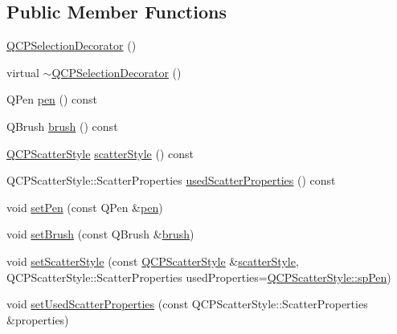 \subsection*{Public Member Functions}
\begin{DoxyCompactItemize}
\item 
\mbox{\hyperlink{class_q_c_p_selection_decorator_aa145480d9a062cd176fe30900bb7bca8}{Q\+C\+P\+Selection\+Decorator}} ()
\item 
virtual \mbox{\hyperlink{class_q_c_p_selection_decorator_ab211eb11379854dcbe23b1642be0d19e}{$\sim$\+Q\+C\+P\+Selection\+Decorator}} ()
\item 
Q\+Pen \mbox{\hyperlink{class_q_c_p_selection_decorator_a9307a60c9759223367909aed2d05ad91}{pen}} () const
\item 
Q\+Brush \mbox{\hyperlink{class_q_c_p_selection_decorator_a783b643aa52120a25308fc501b9998b1}{brush}} () const
\item 
\mbox{\hyperlink{class_q_c_p_scatter_style}{Q\+C\+P\+Scatter\+Style}} \mbox{\hyperlink{class_q_c_p_selection_decorator_aa6558f6f270a188bb633386aba0d1ae4}{scatter\+Style}} () const
\item 
Q\+C\+P\+Scatter\+Style\+::\+Scatter\+Properties \mbox{\hyperlink{class_q_c_p_selection_decorator_ab2019bf31dde39f1ec028e3810dfc08b}{used\+Scatter\+Properties}} () const
\item 
void \mbox{\hyperlink{class_q_c_p_selection_decorator_ac2c8192e1e294aa3a4a7f32a859e3d76}{set\+Pen}} (const Q\+Pen \&\mbox{\hyperlink{class_q_c_p_selection_decorator_a9307a60c9759223367909aed2d05ad91}{pen}})
\item 
void \mbox{\hyperlink{class_q_c_p_selection_decorator_aa74b626be518ea17055f918d423c8c2d}{set\+Brush}} (const Q\+Brush \&\mbox{\hyperlink{class_q_c_p_selection_decorator_a783b643aa52120a25308fc501b9998b1}{brush}})
\item 
void \mbox{\hyperlink{class_q_c_p_selection_decorator_ab403a613289714ff4fd4a0c0371ab116}{set\+Scatter\+Style}} (const \mbox{\hyperlink{class_q_c_p_scatter_style}{Q\+C\+P\+Scatter\+Style}} \&\mbox{\hyperlink{class_q_c_p_selection_decorator_aa6558f6f270a188bb633386aba0d1ae4}{scatter\+Style}}, Q\+C\+P\+Scatter\+Style\+::\+Scatter\+Properties used\+Properties=\mbox{\hyperlink{class_q_c_p_scatter_style_a8974f6a20f8f6eea7781f0e6af9deb46aa04d012e7c03e455db2b68fdd55c2a04}{Q\+C\+P\+Scatter\+Style\+::sp\+Pen}})
\item 
void \mbox{\hyperlink{class_q_c_p_selection_decorator_a808c1607cd4e83869c04986e332455c0}{set\+Used\+Scatter\+Properties}} (const Q\+C\+P\+Scatter\+Style\+::\+Scatter\+Properties \&properties)

\end{DoxyCompactItemize}
